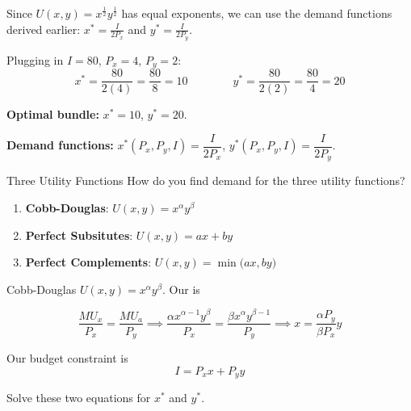 \documentclass{beamer}
\begin{document}
\begin{frame}

  \bigskip
  Since $U(x,y) = x^{\frac{1}{2}}y^{\frac{1}{2}}$ has equal exponents, we can use the demand functions derived earlier: $x^* = \frac{I}{2P_x}$ and $y^* = \frac{I}{2P_y}$.

  \bigskip
  Plugging in $I=80$, $P_x=4$, $P_y=2$:
  $$
    x^* = \frac{80}{2(4)} = \frac{80}{8} = 10
    \qquad\qquad
    y^* = \frac{80}{2(2)} = \frac{80}{4} = 20
  $$

  \bigskip
  \textbf{Optimal bundle:} $x^* = 10$, $y^* = 20$.

  \bigskip
  \textbf{Demand functions:} $x^*(P_x,P_y,I) = \dfrac{I}{2P_x}$, \quad $y^*(P_x,P_y,I) = \dfrac{I}{2P_y}$.
\end{frame}

\begin{frame}{Three Utility Functions}
  How do you find demand for the three utility functions?
  \begin{enumerate}
    \item \textbf{Cobb-Douglas}: $U(x,y) = x^\alpha y^\beta$
    
    \vspace{1.4cm}
    \item \textbf{Perfect Subsitutes}: $U(x,y) = ax + by$
    
    \vspace{1.4cm}
    \item \textbf{Perfect Complements}: $U(x,y) = \min\big(ax, by\big)$
  \end{enumerate}
\end{frame}

\begin{frame}{Cobb-Douglas}
  $U(x,y) = x^\alpha y^\beta$. Our  is 
  
  $$
    \frac{MU_x}{P_x} = \frac{MU_a}{P_y} 
    \implies \frac{\alpha x^{\alpha - 1} y^{\beta}}{P_x} = \frac{\beta x^{\alpha} y^{\beta - 1}}{P_y} 
    \implies x = \frac{\alpha P_y}{\beta P_x} y
  $$

  \bigskip
  Our budget constraint is 
  $$
    I = P_x x + P_y y
  $$

  \bigskip
  Solve these two equations for $x^*$ and $y^*$.
\end{frame}
\end{document}

